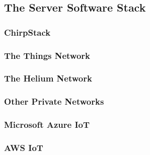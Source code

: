 \subsection{The Server Software Stack}
\subsubsection{ChirpStack}
\subsubsection{The Things Network}

\subsubsection{The Helium Network}


\subsubsection{Other Private Networks}
\subsubsection{Microsoft Azure IoT}
\subsubsection{AWS IoT}
